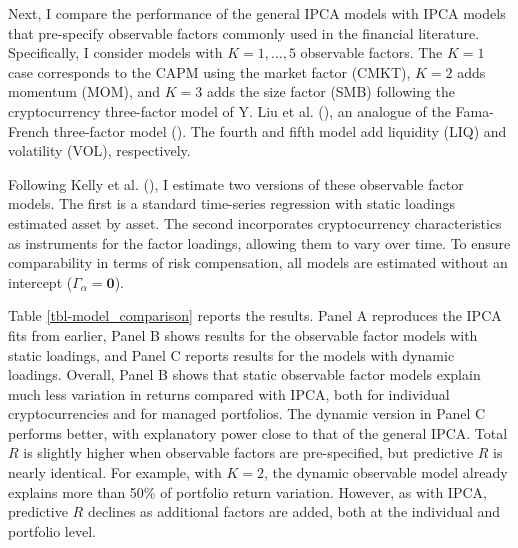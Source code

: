 \documentclass[
  12pt,
  a4paper,
  openany]{scrbook}
\begin{document}
Next, I compare the performance of the general IPCA models with IPCA
models that pre-specify observable factors commonly used in the
financial literature. Specifically, I consider models with
\(K=1,\dots,5\) observable factors. The \(K=1\) case corresponds to the
CAPM using the market factor (CMKT), \(K=2\) adds momentum (MOM), and
\(K=3\) adds the size factor (SMB) following the cryptocurrency
three-factor model of Y. Liu et al.
(), an analogue of the Fama-French
three-factor model (). The fourth and fifth model add liquidity (LIQ) and volatility
(VOL), respectively.

Following Kelly et al.
(), I estimate two
versions of these observable factor models. The first is a standard
time-series regression with static loadings estimated asset by asset.
The second incorporates cryptocurrency characteristics as instruments
for the factor loadings, allowing them to vary over time. To ensure
comparability in terms of risk compensation, all models are estimated
without an intercept (\(\Gamma_\alpha = \mathbf{0}\)).

Table \ref{tbl-model_comparison} reports the results. Panel A reproduces
the IPCA fits from earlier, Panel B shows results for the observable
factor models with static loadings, and Panel C reports results for the
models with dynamic loadings. Overall, Panel B shows that static
observable factor models explain much less variation in returns compared
with IPCA, both for individual cryptocurrencies and for managed
portfolios. The dynamic version in Panel C performs better, with
explanatory power close to that of the general IPCA. Total \(R\) is
slightly higher when observable factors are pre-specified, but
predictive \(R\) is nearly identical. For example, with \(K=2\), the
dynamic observable model already explains more than 50\% of portfolio
return variation. However, as with IPCA, predictive \(R\) declines as
additional factors are added, both at the individual and portfolio
level.
\end{document}
